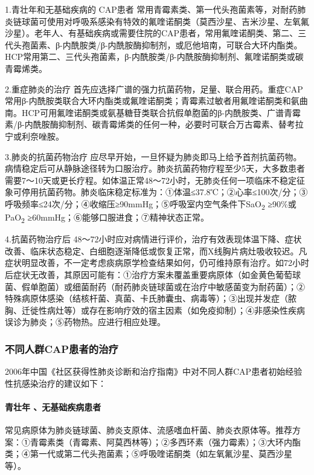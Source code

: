 1.青壮年和无基础疾病的 CAP患者
常用青霉素类、第一代头孢菌素等，对耐药肺炎链球菌可使用对呼吸系感染有特效的氟喹诺酮类（莫西沙星、吉米沙星、左氧氟沙星）。老年人、有基础疾病或需要住院的CAP患者，常用氟喹诺酮类、第二、三代头孢菌素、β-内酰胺类/β-内酰胺酶抑制剂，或厄他培南，可联合大环内酯类。HCP常用第二、三代头孢菌素，β-内酰胺类/β-内酰胺酶抑制剂、氟喹诺酮类或碳青霉烯类。

2.重症肺炎的治疗
首先应选择广谱的强力抗菌药物，足量、联合用药。重症CAP常用β-内酰胺类联合大环内酯类或氟喹诺酮类；青霉素过敏者用氟喹诺酮类和氨曲南。HCP可用氟喹诺酮类或氨基糖苷类联合抗假单胞菌的β-内酰胺类、广谱青霉素/β-内酰胺酶抑制剂、碳青霉烯类的任何一种，必要时可联合万古霉素、替考拉宁或利奈唑胺。

3.肺炎的抗菌药物治疗
应尽早开始，一旦怀疑为肺炎即马上给予首剂抗菌药物。病情稳定后可从静脉途径转为口服治疗。肺炎抗菌药物疗程至少5天，大多数患者需要7～10天或更长疗程。如体温正常48～72小时，无肺炎任何一项临床不稳定征象可停用抗菌药物。肺炎临床稳定标准为：①体温≤37.8℃；②心率≤100次/分；③呼吸频率≤24次/分；④收缩压≥90mmHg；⑤呼吸室内空气条件下SaO\textsubscript{2}
≥90\%或PaO\textsubscript{2} ≥60mmHg；⑥能够口服进食；⑦精神状态正常。

4.抗菌药物治疗后
48～72小时应对病情进行评价，治疗有效表现体温下降、症状改善、临床状态稳定、白细胞逐渐降低或恢复正常，而X线胸片病灶吸收较迟。凡症状明显改善，不一定考虑痰病原学检查结果如何，仍可维持原有治疗。如72小时后症状无改善，其原因可能有：①治疗方案未覆盖重要病原体（如金黄色葡萄球菌、假单胞菌）或细菌耐药（耐药肺炎链球菌或在治疗中敏感菌变为耐药菌）；②特殊病原体感染（结核杆菌、真菌、卡氏肺囊虫、病毒等）；③出现并发症（脓胸、迁徙性病灶等）或存在影响疗效的宿主因素（如免疫抑制）；④非感染性疾病误诊为肺炎；⑤药物热。应进行相应处理。

\subsubsection{不同人群CAP患者的治疗}

2006年中国《社区获得性肺炎诊断和治疗指南》中对不同人群CAP患者初始经验性抗感染治疗的建议如下：

\paragraph{青壮年 、无基础疾病患者}

常见病原体为肺炎链球菌、肺炎支原体、流感嗜血杆菌、肺炎衣原体等。推荐方案：①青霉素类（青霉素、阿莫西林等）；②多西环素（强力霉素）；③大环内酯类；④第一代或第二代头孢菌素；⑤呼吸喹诺酮类（如左氧氟沙星、莫西沙星等）。

